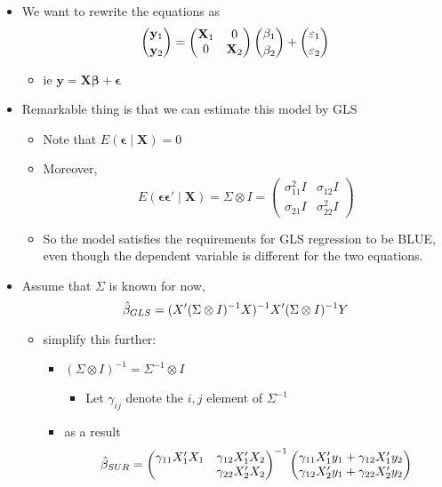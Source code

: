 \begin{itemize}
\item We want to rewrite the equations as
       \[ \binom{\mathbf{y}_1}{\mathbf{y}_2} = \begin{pmatrix} \mathbf{X}_1
       & 0 \\ 0 & \mathbf{X}_2  \end{pmatrix}
       \binom{\beta_1}{\beta_2} +
      \binom{\mathbf{\varepsilon}_1}{\mathbf{\varepsilon}_2} \]
\begin{itemize}
\item ie $\mathbf{y} = \mathbf{X} \mathbf{\beta} + \mathbf{\epsilon}$
\end{itemize}
\item Remarkable thing is that we can estimate this model by GLS
\begin{itemize}
\item Note that $E(\mathbf{\epsilon} \mid \mathbf{X}) = 0$
\item Moreover,
  \[E(\mathbf{\epsilon} \mathbf{\epsilon}' \mid \mathbf{X}) = \Sigma \otimes I =
  \begin{pmatrix} \sigma^2_{11} I & \sigma_{12} I \\ \sigma_{21} I & \sigma^2_{22} I \end{pmatrix}\]
\item So the model satisfies the requirements for GLS regression to
         be BLUE, even though the dependent variable is different for
         the two equations.
\end{itemize}
\item Assume that $\Sigma$ is known for now, 
  \[\hat{\beta}_{GLS} = (X'(\Sigma \otimes I)^{-1}X)^{-1}X'(\Sigma \otimes I)^{-1}Y\]
\begin{itemize}
\item simplify this further:
\begin{itemize}
\item $(\Sigma \otimes I)^{-1} = \Sigma^{-1} \otimes I$
\begin{itemize}
\item Let $\gamma_{ij}$ denote the $i,j$ element of $\Sigma^{-1}$
\end{itemize}
\item as a result
  \[\hat{\beta}_{SUR} = \begin{pmatrix}
    \gamma_{11} X_1'X_1 & \gamma_{12} X_1'X_2 \\ & \gamma_{22} X_2'X_2 
  \end{pmatrix}^{-1} 
  \begin{pmatrix}
    \gamma_{11} X_1'y_1 + \gamma_{12} X_1'y_2 \\ \gamma_{12} X_2'y_1 + \gamma_{22} X_2'y_2

\end{pmatrix}\]
\end{itemize}
\end{itemize}
\end{itemize}
